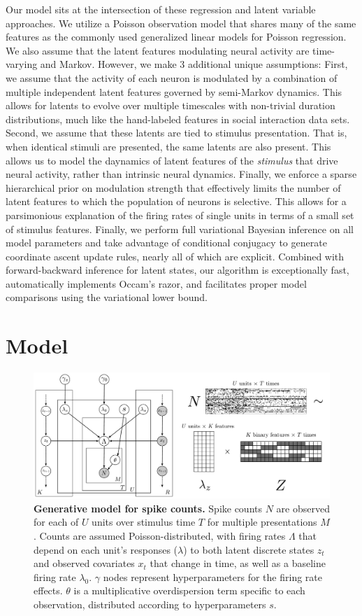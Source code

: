 \documentclass{article} %
\begin{document}
Our model sits at the intersection of these regression and latent variable approaches. We utilize a Poisson observation model that shares many of the same features as the commonly used generalized linear models for Poisson regression. We also assume that the latent features modulating neural activity are time-varying and Markov. However, we make 3 additional unique assumptions: First, we assume that the activity of each neuron is modulated by a combination of multiple independent latent features governed by semi-Markov dynamics. This allows for latents to evolve over multiple timescales with non-trivial duration distributions, much like the hand-labeled features in social interaction data sets. Second, we assume that these latents are tied to stimulus presentation. That is, when identical stimuli are presented, the same latents are also present. This allows us to model the daynamics of latent features of the \emph{stimulus} that drive neural activity, rather than intrinsic neural dynamics. Finally, we enforce a sparse hierarchical prior on modulation strength that effectively limits the number of latent features to which the population of neurons is selective. This allows for a parsimonious explanation of the firing rates of single units in terms of a small set of stimulus features. Finally, we perform full variational Bayesian inference on all model parameters and take advantage of conditional conjugacy to generate coordinate ascent update rules, nearly all of which are explicit. Combined with forward-backward inference for latent states, our algorithm is exceptionally fast, automatically implements Occam's razor, and facilitates proper model comparisons using the variational lower bound.

\section{Model}
\label{model_sec}
\begin{figure}[ht]
    \center
    \includegraphics[width=0.7\linewidth]{figures/model}
    \caption{\textbf{Generative model for spike counts.} Spike counts $N$ are observed for each of $U$ units over stimulus time $T$ for multiple presentations $M$. Counts are assumed Poisson-distributed, with firing rates $\Lambda$ that depend on each unit's responses ($\lambda$) to both latent discrete states $z_t$ and observed covariates $x_t$ that change in time, as well as a baseline firing rate $\lambda_0$. $\gamma$ nodes represent hyperparameters for the firing rate effects. $\theta$ is a multiplicative overdispersion term specific to each observation, distributed according to hyperparameters $s$.}
\end{figure}
\end{document}
